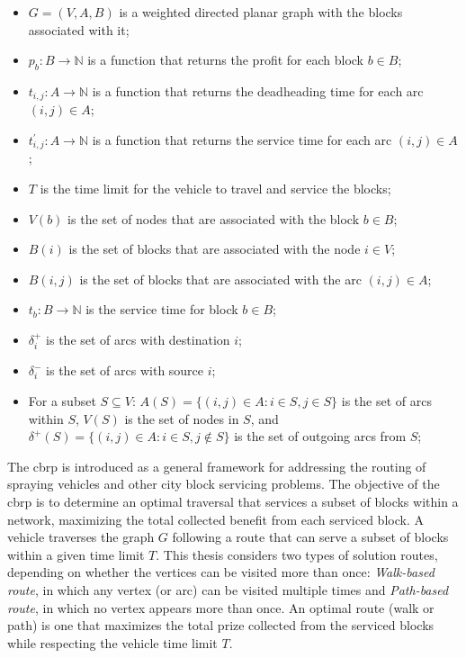 \begin{itemize}
	\item $G = (V, A, B)$ is a weighted directed planar graph with the blocks associated with it;
	\item $p_b : B \rightarrow \mathbb{N}$ is a function that returns the profit
	      for each block $b \in B$;
	\item $t_{i, j} : A \rightarrow \mathbb{N}$ is a function that returns the
	      deadheading time for each arc $(i, j) \in A$;
	\item $t^{'}_{i, j} : A \rightarrow \mathbb{N}$ is a function that returns
	      the service time for each arc $(i, j) \in A$;
	\item $T$ is the time limit for the vehicle to travel and service the blocks;
	\item $V(b)$ is the set of nodes that are associated with the block $b \in B$;
	\item $B(i)$ is the set of blocks that are associated with the node $i \in V$;
	\item $B(i, j)$ is the set of blocks that are associated with the arc $(i, j) \in A$;
	\item $t_b : B \rightarrow \mathbb{N}$ is the service time for block $b \in B$;
	\item $\delta^{+}_{i}$ is the set of arcs with destination $i$;
	\item $\delta^{-}_{i}$ is the set of arcs with source $i$;
	\item For a subset $S \subseteq V$: $A(S) = \{(i,j) \in A : i \in S, j \in S\}$ is the set of arcs within $S$, $V(S)$ is the set of nodes in $S$, and $\delta^{+}(S) = \{(i,j) \in A : i \in S, j \notin S\}$ is the set of outgoing arcs from $S$;
\end{itemize}

The \gls{cbrp} is introduced as a general framework for addressing the routing
of spraying vehicles and other city block servicing problems. The objective of
the \gls{cbrp} is to determine an optimal traversal that services a subset of
blocks within a network, maximizing the total collected benefit from each
serviced block. A vehicle traverses the graph $G$ following a route that can
serve a subset of blocks within a given time limit $T$. This thesis considers two
types of solution routes, depending on whether the vertices can be visited more
than once: \textit{Walk-based route}, in which any vertex (or arc) can be
visited multiple times and \textit{Path-based route}, in which no vertex appears
more than once. An optimal route (walk or path) is one that maximizes the total
prize collected from the serviced blocks while respecting the vehicle time limit
$T$.


